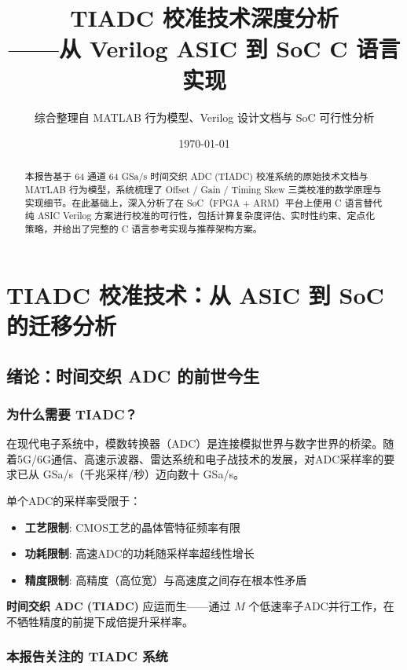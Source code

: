 \documentclass[UTF8,a4paper,11pt]{ctexart}
\title{TIADC 校准技术深度分析\\{\large ——从 Verilog ASIC 到 SoC C 语言实现}}
\author{综合整理自 MATLAB 行为模型、Verilog 设计文档与 SoC 可行性分析}
\date{\today}
\begin{document}
\maketitle
\begin{abstract}
本报告基于 64 通道 64 GSa/s 时间交织 ADC (TIADC) 校准系统的原始技术文档与 MATLAB 行为模型，系统梳理了 Offset / Gain / Timing Skew 三类校准的数学原理与实现细节。在此基础上，深入分析了在 SoC（FPGA + ARM）平台上使用 C 语言替代纯 ASIC Verilog 方案进行校准的可行性，包括计算复杂度评估、实时性约束、定点化策略，并给出了完整的 C 语言参考实现与推荐架构方案。
\end{abstract}

\tableofcontents
\clearpage

\section{TIADC 校准技术：从 ASIC 到 SoC 的迁移分析}
\label{sec:tiadc_soc}

\subsection{绪论：时间交织 ADC 的前世今生}
\label{sec:intro}

\subsubsection{为什么需要 TIADC？}

在现代电子系统中，模数转换器（ADC）是连接模拟世界与数字世界的桥梁。随着5G/6G通信、高速示波器、雷达系统和电子战技术的发展，对ADC采样率的要求已从 GSa/s（千兆采样/秒）迈向数十 GSa/s。

单个ADC的采样率受限于：
\begin{itemize}
    \item \textbf{工艺限制}: CMOS工艺的晶体管特征频率有限
    \item \textbf{功耗限制}: 高速ADC的功耗随采样率超线性增长
    \item \textbf{精度限制}: 高精度（高位宽）与高速度之间存在根本性矛盾
\end{itemize}

\textbf{时间交织 ADC (TIADC)} 应运而生——通过 $M$ 个低速率子ADC并行工作，在不牺牲精度的前提下成倍提升采样率。

\subsubsection{本报告关注的 TIADC 系统}
\end{document}
